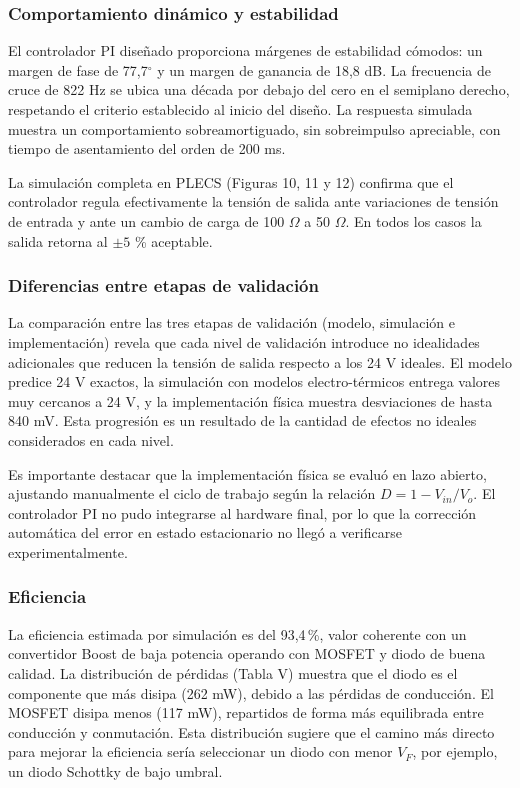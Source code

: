 \documentclass[conference]{IEEEtran}
\begin{document}
\subsubsection{Comportamiento dinámico y estabilidad}

El controlador PI diseñado proporciona márgenes de estabilidad cómodos: un margen de fase de 77,7$^\circ$ y un margen de ganancia de 18,8 dB. La frecuencia de cruce de 822 Hz se ubica una década por debajo del cero en el semiplano derecho, respetando el criterio establecido al inicio del diseño. La respuesta simulada muestra un comportamiento sobreamortiguado, sin sobreimpulso apreciable, con tiempo de asentamiento del orden de 200 ms.

La simulación completa en PLECS (Figuras 10, 11 y 12) confirma que el controlador regula efectivamente la tensión de salida ante variaciones de tensión de entrada y ante un cambio de carga de 100 $\Omega$ a 50 $\Omega$. En todos los casos la salida retorna al $\pm 5$ \% aceptable.

\subsubsection{Diferencias entre etapas de validación}

La comparación entre las tres etapas de validación (modelo, simulación e implementación) revela que cada nivel de validación introduce no idealidades adicionales que reducen la tensión de salida respecto a los 24 V ideales. El modelo predice 24 V exactos, la simulación con modelos electro-térmicos entrega valores muy cercanos a 24 V, y la implementación física muestra desviaciones de hasta 840 mV. Esta progresión es un resultado de la cantidad de efectos no ideales considerados en cada nivel.

Es importante destacar que la implementación física se evaluó en lazo abierto, ajustando manualmente el ciclo de trabajo según la relación $D = 1 - V_{in}/V_o$. El controlador PI no pudo integrarse al hardware final, por lo que la corrección automática del error en estado estacionario no llegó a verificarse experimentalmente.

\subsubsection{Eficiencia}

La eficiencia estimada por simulación es del 93,4\,\%, valor coherente con un convertidor Boost de baja potencia operando con MOSFET y diodo de buena calidad. La distribución de pérdidas (Tabla V) muestra que el diodo es el componente que más disipa (262 mW), debido a las pérdidas de conducción. El MOSFET disipa menos (117 mW), repartidos de forma más equilibrada entre conducción y conmutación. Esta distribución sugiere que el camino más directo para mejorar la eficiencia sería seleccionar un diodo con menor $V_F$, por ejemplo, un diodo Schottky de bajo umbral.
\end{document}
